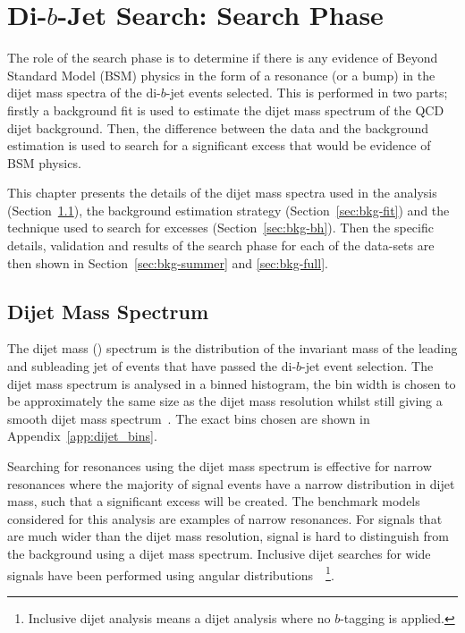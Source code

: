 \chapter{Di-$b$-Jet Search: Search Phase}
\label{sec:bkg}

\vspace{-0.5em}
The role of the search phase is to determine if there is any evidence of Beyond Standard Model (BSM)
physics in the form of a resonance (or a bump) in the dijet mass spectra of the di-$b$-jet events selected.
This is performed in two parts; firstly a background fit is used to estimate
the dijet mass spectrum of the QCD dijet background.
Then, the difference between the data and the background estimation is used 
to search for a significant excess that would be evidence of BSM physics.


This chapter presents
the details of the dijet mass  spectra used in the analysis (Section~\ref{sec:bkg-mjj}),
the background estimation strategy (Section~\ref{sec:bkg-fit}) and
the technique used to search for excesses (Section~\ref{sec:bkg-bh}).
Then the specific details, validation and results of the search phase for each of the data-sets are
then shown in Section~\ref{sec:bkg-summer} and \ref{sec:bkg-full}.

\section{Dijet Mass Spectrum}
\label{sec:bkg-mjj}

The dijet mass (\mjj) spectrum
is the distribution of the invariant mass of the leading and subleading jet
of events that have passed the di-$b$-jet event selection.
The dijet mass spectrum is analysed in a binned histogram,
the bin width is chosen to be approximately the same size as the dijet mass resolution
whilst still giving a smooth dijet mass spectrum~\cite{dijet-mori16_paper}.
The exact bins chosen are shown in Appendix~\ref{app:dijet_bins}.

Searching for resonances using the dijet mass spectrum is effective
for narrow resonances where the majority of signal events have a narrow distribution in dijet mass,
such that a significant excess will be created.
The benchmark models considered for this analysis are examples of narrow resonances.
For signals that are much wider than the dijet mass resolution,
signal is hard to distinguish from the background using a dijet mass spectrum.
Inclusive dijet searches for wide signals have been performed using angular distributions~\cite{dijet-mori16_paper}~\footnote{Inclusive
  dijet analysis means a dijet analysis where no $b$-tagging is applied.}.

